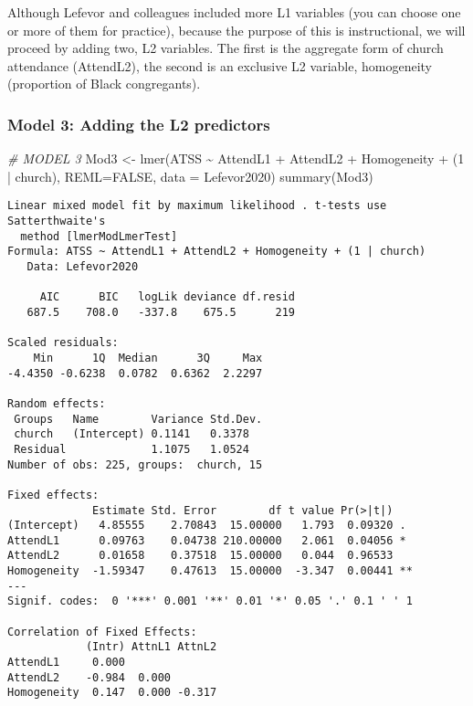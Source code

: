 \documentclass[
  11pt,
]{book}
\newenvironment{Shaded}{\begin{snugshade}}{\end{snugshade}}
\newcommand{\AttributeTok}[1]{\textcolor[rgb]{0.77,0.63,0.00}{#1}}
\newcommand{\CommentTok}[1]{\textcolor[rgb]{0.56,0.35,0.01}{\textit{#1}}}
\newcommand{\ConstantTok}[1]{\textcolor[rgb]{0.00,0.00,0.00}{#1}}
\newcommand{\DecValTok}[1]{\textcolor[rgb]{0.00,0.00,0.81}{#1}}
\newcommand{\FunctionTok}[1]{\textcolor[rgb]{0.00,0.00,0.00}{#1}}
\newcommand{\NormalTok}[1]{#1}
\newcommand{\OtherTok}[1]{\textcolor[rgb]{0.56,0.35,0.01}{#1}}
\newcommand{\SpecialCharTok}[1]{\textcolor[rgb]{0.00,0.00,0.00}{#1}}
\begin{document}
Although Lefevor and colleagues \citeyearpar{lefevor_homonegativity_2020} included more L1 variables (you can choose one or more of them for practice), because the purpose of this is instructional, we will proceed by adding two, L2 variables. The first is the aggregate form of church attendance (AttendL2), the second is an exclusive L2 variable, homogeneity (proportion of Black congregants).

\hypertarget{model-3-adding-the-l2-predictors}{%
\subsubsection{Model 3: Adding the L2 predictors}\label{model-3-adding-the-l2-predictors}}

\begin{Shaded}
\begin{Highlighting}[]
\CommentTok{\# MODEL 3}
\NormalTok{Mod3 }\OtherTok{\textless{}{-}} \FunctionTok{lmer}\NormalTok{(ATSS }\SpecialCharTok{\textasciitilde{}}\NormalTok{ AttendL1 }\SpecialCharTok{+}\NormalTok{ AttendL2 }\SpecialCharTok{+}\NormalTok{ Homogeneity }\SpecialCharTok{+}\NormalTok{ (}\DecValTok{1} \SpecialCharTok{|}\NormalTok{ church), }\AttributeTok{REML=}\ConstantTok{FALSE}\NormalTok{, }\AttributeTok{data =}\NormalTok{ Lefevor2020)}
\FunctionTok{summary}\NormalTok{(Mod3)}
\end{Highlighting}
\end{Shaded}

\begin{verbatim}
Linear mixed model fit by maximum likelihood . t-tests use Satterthwaite's
  method [lmerModLmerTest]
Formula: ATSS ~ AttendL1 + AttendL2 + Homogeneity + (1 | church)
   Data: Lefevor2020

     AIC      BIC   logLik deviance df.resid 
   687.5    708.0   -337.8    675.5      219 

Scaled residuals: 
    Min      1Q  Median      3Q     Max 
-4.4350 -0.6238  0.0782  0.6362  2.2297 

Random effects:
 Groups   Name        Variance Std.Dev.
 church   (Intercept) 0.1141   0.3378  
 Residual             1.1075   1.0524  
Number of obs: 225, groups:  church, 15

Fixed effects:
             Estimate Std. Error        df t value Pr(>|t|)   
(Intercept)   4.85555    2.70843  15.00000   1.793  0.09320 . 
AttendL1      0.09763    0.04738 210.00000   2.061  0.04056 * 
AttendL2      0.01658    0.37518  15.00000   0.044  0.96533   
Homogeneity  -1.59347    0.47613  15.00000  -3.347  0.00441 **
---
Signif. codes:  0 '***' 0.001 '**' 0.01 '*' 0.05 '.' 0.1 ' ' 1

Correlation of Fixed Effects:
            (Intr) AttnL1 AttnL2
AttendL1     0.000              
AttendL2    -0.984  0.000       
Homogeneity  0.147  0.000 -0.317
\end{verbatim}
\end{document}
